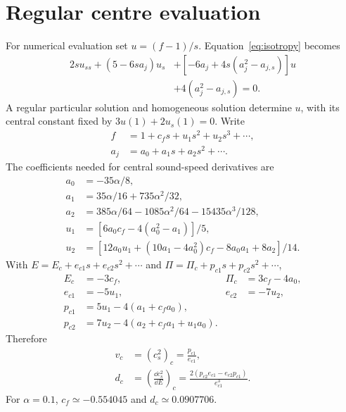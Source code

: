 \ifdefined\appendices\appendices\else\appendix\fi
\section{Regular centre evaluation}
\label{app:centre}
For numerical evaluation set $u=(f-1)/s$. Equation~\eqref{eq:isotropy} becomes
\begin{align}
 2s u_{ss}+(5-6sa_j)u_s
 &+[-6a_j+4s(a_j^2-a_{j,s})]u\nonumber\\
 &+4(a_j^2-a_{j,s})=0.
\end{align}
A regular particular solution and homogeneous solution determine $u$, with its central constant fixed by $3u(1)+2u_s(1)=0$. Write
\begin{align}
 f&=1+c_f s+u_1s^2+u_2s^3+\cdots,\nonumber\\
 a_j&=a_0+a_1s+a_2s^2+\cdots.
\end{align}
The coefficients needed for central sound-speed derivatives are
\begin{align}
 a_0&=-35\alpha/8,\nonumber\\
 a_1&=35\alpha/16+735\alpha^2/32,\nonumber\\
 a_2&=385\alpha/64-1085\alpha^2/64-15435\alpha^3/128,\\
 u_1&=[6a_0c_f-4(a_0^2-a_1)]/5,\nonumber\\
 u_2&=[12a_0u_1+(10a_1-4a_0^2)c_f-8a_0a_1+8a_2]/14.
\end{align}
With $E=E_c+e_{c1}s+e_{c2}s^2+\cdots$ and $\Pi=\Pi_c+p_{c1}s+p_{c2}s^2+\cdots$,
\begin{align}
 E_c&=-3c_f,&\Pi_c&=3c_f-4a_0,\nonumber\\
 e_{c1}&=-5u_1,&e_{c2}&=-7u_2,\nonumber\\
 p_{c1}&=5u_1-4(a_1+c_fa_0),\nonumber\\
 p_{c2}&=7u_2-4(a_2+c_fa_1+u_1a_0).
\end{align}
Therefore
\begin{align}
 v_c&=(c_s^2)_c=\frac{p_{c1}}{e_{c1}},\nonumber\\
 d_c&=\left(\frac{\dd c_s^2}{\dd E}\right)_c
     =\frac{2(p_{c2}e_{c1}-e_{c2}p_{c1})}{e_{c1}^3}.
\end{align}
For $\alpha=0.1$, $c_f\simeq-0.554045$ and $d_c\simeq0.0907706$.

